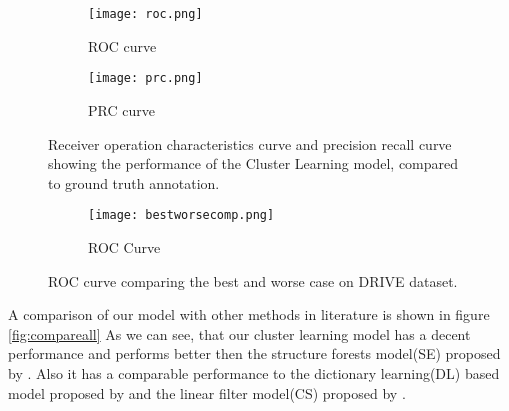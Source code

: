 \begin{figure}
	\centering
	\begin{subfigure}[b]{0.45\textwidth}
		\texttt{[image: roc.png]}
		\caption{ROC curve}
		\label{fig:roc}
	\end{subfigure}
	\begin{subfigure}[b]{0.45\textwidth}
		\texttt{[image: prc.png]}
		\caption{PRC curve}
		\label{fig:prc}
	\end{subfigure}
	\caption[ROC and PRC curve for Cluster Learning based model]{Receiver operation characteristics curve and precision recall curve showing the performance of the Cluster Learning model, compared to ground truth annotation.}
	\label{fig:rocprc}
\end{figure}
\begin{figure}
	\centering
	
	\begin{subfigure}[b]{0.75\textwidth}
		\texttt{[image: bestworsecomp.png]}
		\caption{ROC Curve}
		\label{fig:bestworse}
	\end{subfigure}
	\caption[ROC curve comparing the best and worse case on DRIVE set]{ROC curve comparing the best and worse case on DRIVE dataset.}
	\label{fig:bestroc}
\end{figure}
\clearpage
A comparison of our model with other methods in literature is shown in figure \ref{fig:compareall}
As we can see, that our cluster learning model has a decent performance and performs better then the structure forests model(SE) proposed by \citep{dollar2013structured}. Also it has a comparable performance to the dictionary learning(DL) based model proposed by \citep{rigamonti2013learning}  and the linear filter model(CS) proposed by \cite{rigamonti2012accurate}.\\

